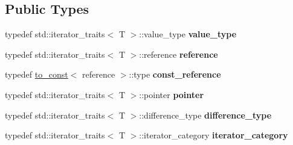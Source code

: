 \subsection*{Public Types}
\begin{DoxyCompactItemize}
\item 
\mbox{\label{structcugar_1_1strided__iterator_a6b9c68b63c2e87663e40191bbf307de0}} 
typedef std\+::iterator\+\_\+traits$<$ T $>$\+::value\+\_\+type {\bfseries value\+\_\+type}
\item 
\mbox{\label{structcugar_1_1strided__iterator_aa6145b75dee5338fad877d5e3340afa3}} 
typedef std\+::iterator\+\_\+traits$<$ T $>$\+::reference {\bfseries reference}
\item 
\mbox{\label{structcugar_1_1strided__iterator_aa606cca64f9ee4c45145f89e23f75a1d}} 
typedef \hyperlink{structcugar_1_1to__const}{to\+\_\+const}$<$ reference $>$\+::type {\bfseries const\+\_\+reference}
\item 
\mbox{\label{structcugar_1_1strided__iterator_ad9e7420b64a1b8fa423ea6f6d4f22065}} 
typedef std\+::iterator\+\_\+traits$<$ T $>$\+::pointer {\bfseries pointer}
\item 
\mbox{\label{structcugar_1_1strided__iterator_a4828a1be0fadfd233cbd4557616cdc69}} 
typedef std\+::iterator\+\_\+traits$<$ T $>$\+::difference\+\_\+type {\bfseries difference\+\_\+type}
\item 
\mbox{\label{structcugar_1_1strided__iterator_a4c3a83f8229e65f43b3e75a0eba2a771}} 
typedef std\+::iterator\+\_\+traits$<$ T $>$\+::iterator\+\_\+category {\bfseries iterator\+\_\+category}
\end{DoxyCompactItemize}
